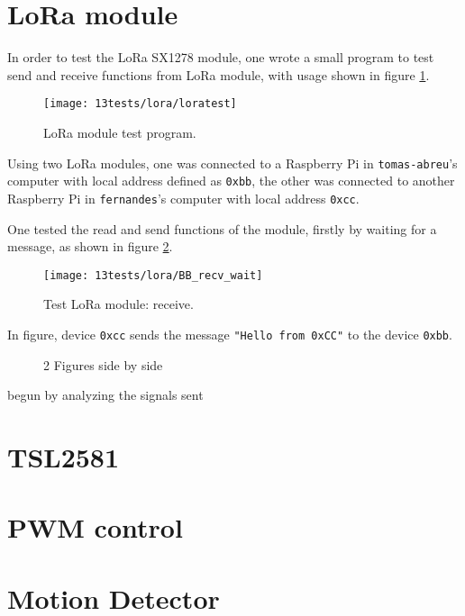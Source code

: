 \section{LoRa module}
In order to test the LoRa SX1278 module, one wrote a small program to test send and receive functions from LoRa module, with usage shown in figure \ref{fig:loratest}.

\begin{figure}[H]
	\centering	
	\texttt{[image: 13tests/lora/loratest]}
	\caption{LoRa module test program.}
	\label{fig:loratest}
\end{figure}

Using two LoRa modules, one was connected to a Raspberry Pi in\linebreak
\verb|tomas-abreu|'s computer with local address defined as \verb|0xbb|, the other was connected to another Raspberry Pi in \verb|fernandes|'s computer with local address \verb|0xcc|.

One tested the read and send functions of the module, firstly by waiting for a message, as shown in figure \ref{fig:loratest_recv}.

\begin{figure}[H]
	\centering	
	\texttt{[image: 13tests/lora/BB\_recv\_wait]}
	\caption{Test LoRa module: receive.}
	\label{fig:loratest_recv}
\end{figure}

In figure, device \verb|0xcc| sends the message \verb|"Hello from 0xCC"| to the device \verb|0xbb|.

\begin{figure}[H]%
	\centering
	\qquad
	\caption{2 Figures side by side}%
	\label{fig:example}%
\end{figure}



begun by analyzing the signals sent 


\section{TSL2581}

\section{PWM control}

\section{Motion Detector}